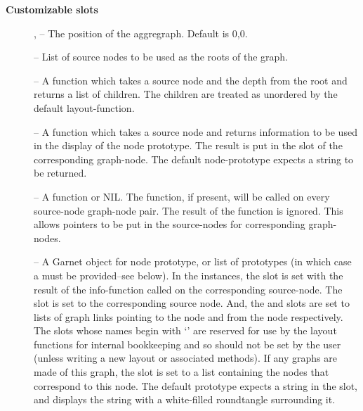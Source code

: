 {\bf Customizable slots}
        \begin{description}
\item[]                 ,  -- The position of the aggregraph.
                Default is 0,0.

\item[]                  -- List of source nodes to be used as the
                roots of the graph.

\item[]                  -- A function which takes a source
                node and the depth from the root and
                returns a list of children.  The children are treated
                as unordered by the default layout-function.

\item[]                  -- A function which takes a source node and
                returns information to be used in the display of the
                node prototype.  The result is put in the  slot
                of the corresponding graph-node.  The default node-prototype
                expects a string to be returned.

\item[]                  -- A function or NIL.
                The function, if present, will be called on every
                source-node graph-node pair.  The result of the
                function is ignored.  This allows pointers to be
                put in the source-nodes for corresponding graph-nodes.

\item[]                  -- A Garnet object for node prototype, or
                list of prototypes (in which case a
                 must be
                provided--see below).  In the
                instances, the  slot is set with the result of the
                info-function called on the corresponding source-node.  The
		 slot is set to the corresponding source node.
                And, the  and  slots are
                set to
                lists of graph links pointing to the node and from the node
                respectively.  The slots whose names begin with
`' are reserved for use by the layout functions for internal
bookkeeping and so should not be set by the user (unless writing a new
layout or associated methods). If any  graphs are
made of this graph, the  slot is set to a list containing the
nodes that correspond to this node.  The default prototype expects a string in
the  slot, and displays the string with a white-filled
roundtangle surrounding it.


\end{description}

